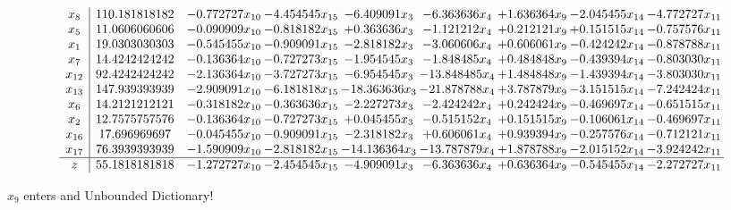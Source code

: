 \documentclass[10pt]{article}
\begin{document}
 \[\begin{array}{c| c c@{\hskip 2pt} c@{\hskip 2pt} c@{\hskip 2pt} c@{\hskip 2pt} c@{\hskip 2pt} c@{\hskip 2pt} c@{\hskip 2pt} }
 x_{8}   &  110.181818182 & -0.772727 x_{10} & -4.454545 x_{15} & -6.409091 x_{3} & -6.363636 x_{4} & + 1.636364 x_{9} & -2.045455 x_{14} & -4.772727 x_{11}\\
 x_{5}   &  11.0606060606 & -0.090909 x_{10} & -0.818182 x_{15} & + 0.363636 x_{3} & -1.121212 x_{4} & + 0.212121 x_{9} & + 0.151515 x_{14} & -0.757576 x_{11}\\
 x_{1}   &  19.0303030303 & -0.545455 x_{10} & -0.909091 x_{15} & -2.818182 x_{3} & -3.060606 x_{4} & + 0.606061 x_{9} & -0.424242 x_{14} & -0.878788 x_{11}\\
 x_{7}   &  14.4242424242 & -0.136364 x_{10} & -0.727273 x_{15} & -1.954545 x_{3} & -1.848485 x_{4} & + 0.484848 x_{9} & -0.439394 x_{14} & -0.803030 x_{11}\\
 x_{12}   &  92.4242424242 & -2.136364 x_{10} & -3.727273 x_{15} & -6.954545 x_{3} & -13.848485 x_{4} & + 1.484848 x_{9} & -1.439394 x_{14} & -3.803030 x_{11}\\
 x_{13}   &  147.939393939 & -2.909091 x_{10} & -6.181818 x_{15} & -18.363636 x_{3} & -21.878788 x_{4} & + 3.787879 x_{9} & -3.151515 x_{14} & -7.242424 x_{11}\\
 x_{6}   &  14.2121212121 & -0.318182 x_{10} & -0.363636 x_{15} & -2.227273 x_{3} & -2.424242 x_{4} & + 0.242424 x_{9} & -0.469697 x_{14} & -0.651515 x_{11}\\
 x_{2}   &  12.7575757576 & -0.136364 x_{10} & -0.727273 x_{15} & + 0.045455 x_{3} & -0.515152 x_{4} & + 0.151515 x_{9} & -0.106061 x_{14} & -0.469697 x_{11}\\
 x_{16}   &  17.696969697 & -0.045455 x_{10} & -0.909091 x_{15} & -2.318182 x_{3} & + 0.606061 x_{4} & + 0.939394 x_{9} & -0.257576 x_{14} & -0.712121 x_{11}\\
 x_{17}   &  76.3939393939 & -1.590909 x_{10} & -2.818182 x_{15} & -14.136364 x_{3} & -13.787879 x_{4} & + 1.878788 x_{9} & -2.015152 x_{14} & -3.924242 x_{11}\\
\hline
z    &  55.1818181818 & -1.272727 x_{10} & -2.454545 x_{15} & -4.909091 x_{3} & -6.363636 x_{4} & + 0.636364 x_{9} & -0.545455 x_{14} & -2.272727 x_{11}\\
\end{array}\]


 $ x_{9} $ enters and Unbounded Dictionary!
\end{document}
